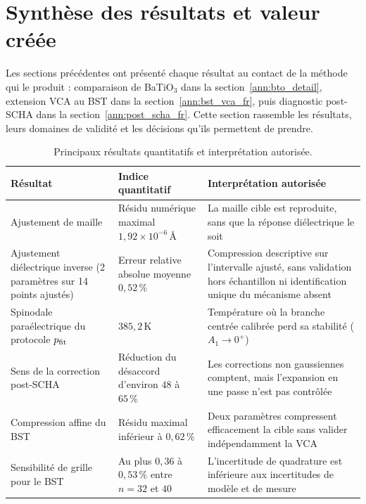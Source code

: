\documentclass{rapportCS}
\begin{document}



\section{\texorpdfstring{\enspace Synthèse des résultats et valeur créée}{Synthèse des résultats et valeur créée}}
\label{sec:results_value}

Les sections précédentes ont présenté chaque résultat au contact de la méthode
qui le produit : comparaison de BaTiO$_3$ dans la
section~\ref{ann:bto_detail}, extension VCA au BST dans la
section~\ref{ann:bst_vca_fr}, puis diagnostic post-SCHA dans la
section~\ref{ann:post_scha_fr}. Cette section rassemble les résultats, leurs
domaines de validité et les décisions qu'ils permettent de prendre.

\begin{table}[H]
\centering
\caption{Principaux résultats quantitatifs et interprétation autorisée.}
\label{tab:cs_result_synthesis}
\begin{tabular}{p{}p{}p{}}
\hline
Résultat & Indice quantitatif & Interprétation autorisée \\
\hline
Ajustement de maille & Résidu numérique maximal $1{,}92\times10^{-6}\,\text{\AA}$ & La maille cible est reproduite, sans que la réponse diélectrique le soit \\
Ajustement diélectrique inverse (2 paramètres sur 14 points ajustés) & Erreur relative absolue moyenne $0{,}52\,\%$ & Compression descriptive sur l'intervalle ajusté, sans validation hors échantillon ni identification unique du mécanisme absent \\
Spinodale paraélectrique du protocole $p_{\rm fit}$ & $385{,}2\,\mathrm K$ & Température où la branche centrée calibrée perd sa stabilité ($A_1\to0^+$) \\
Sens de la correction post-SCHA & Réduction du désaccord d'environ $48$ à $65\,\%$ & Les corrections non gaussiennes comptent, mais l'expansion en une passe n'est pas contrôlée \\
Compression affine du BST & Résidu maximal inférieur à $0{,}62\,\%$ & Deux paramètres compressent efficacement la cible sans valider indépendamment la VCA \\
Sensibilité de grille pour le BST & Au plus $0{,}36$ à $0{,}53\,\%$ entre $n=32$ et $40$ & L'incertitude de quadrature est inférieure aux incertitudes de modèle et de mesure \\
\hline
\end{tabular}
\end{table}
\end{document}

